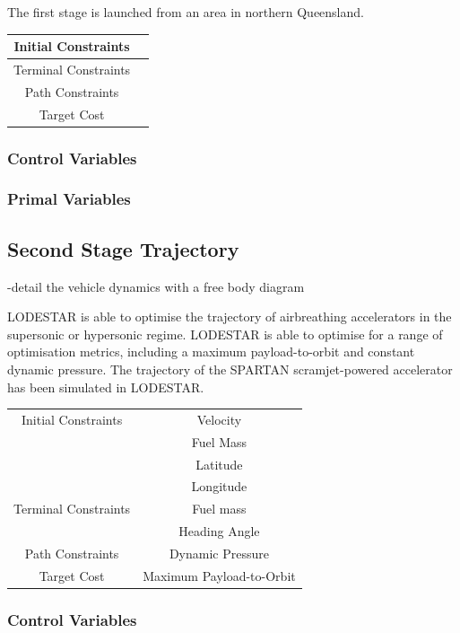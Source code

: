 The first stage is launched from an area in northern Queensland.

\begin{tabular}{|c|c|}
	\hline Initial Constraints  & \\ 
	\hline Terminal Constraints &  \\ 
	\hline Path Constraints &  \\ 
	\hline Target Cost &  \\ 
	\hline 
\end{tabular} 

\subsubsection{Control Variables}

\subsubsection{Primal Variables}

\subsection{Second Stage Trajectory}

-detail the vehicle dynamics with a free body diagram 

LODESTAR is able to optimise the trajectory of airbreathing accelerators in the supersonic or hypersonic regime. LODESTAR is able to optimise for a range of optimisation metrics, including a maximum payload-to-orbit and constant dynamic pressure.  
The trajectory of the SPARTAN scramjet-powered accelerator has been simulated in LODESTAR. 

\begin{tabular}{|c|c|}
	\hline Initial Constraints  & Velocity \\ & Fuel Mass  \\ & Latitude \\ & Longitude \\ 
	\hline Terminal Constraints & Fuel mass \\ & Heading Angle \\ 
	\hline Path Constraints & Dynamic Pressure \\ 
	\hline Target Cost & Maximum Payload-to-Orbit \\ 
	\hline 
\end{tabular} 

\subsubsection{Control Variables}

